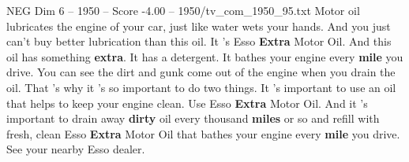 \begin{textsample}{NEG Dim 6 – 1950 – Score -4.00 – 1950/tv\_com\_1950\_95.txt}  \label{ex:f6_neg_084}
Motor oil lubricates the engine of your car, just like water wets your hands.
And you just can't buy better lubrication than this oil.
It 's Esso \textbf{Extra} Motor Oil.
And this oil has something \textbf{extra}.
It has a detergent.
It bathes your engine every \textbf{mile} you drive.
You can see the dirt and gunk come out of the engine when you drain the oil.
That 's why it 's so important to do two things.
It 's important to use an oil that helps to keep your engine clean.
Use Esso \textbf{Extra} Motor Oil.
And it 's important to drain away \textbf{dirty} oil every thousand \textbf{miles} or so and refill with fresh, clean Esso \textbf{Extra} Motor Oil that bathes your engine every \textbf{mile} you drive.
See your nearby Esso dealer.

\end{textsample}
